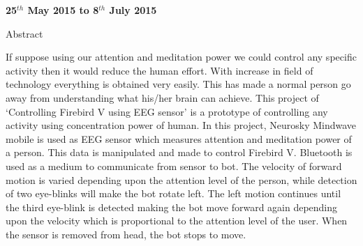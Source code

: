 \documentclass[14pt]{article}
\begin{document}
\begin{center}
\textbf{{\LARGE 25$^{th}$ May 2015 to 8$^{th}$ July 2015}}
\end{center}
\break
\begin{center}
{\Huge Abstract}
\end{center}

{\large If suppose using our attention and meditation power we could control any specific activity then it would reduce the human effort. With increase in field of technology everything is obtained very easily. This has made a normal person go away from understanding what his/her brain can achieve. This project of ‘Controlling Firebird V using EEG sensor’ is a prototype of controlling any activity using concentration power of human. In this project, Neurosky Mindwave mobile is used as EEG sensor which measures attention and meditation power of a person. This data is manipulated and made to control Firebird V. Bluetooth is used as a medium to communicate from sensor to bot. The velocity of forward motion is varied depending upon the attention level of the person, while detection of two eye-blinks will make the bot rotate left. The left motion continues until the third eye-blink is detected making the bot move forward again depending upon the velocity which is proportional to the attention level of the user. When the sensor is removed from head, the bot stops to move.}
\end{document}
